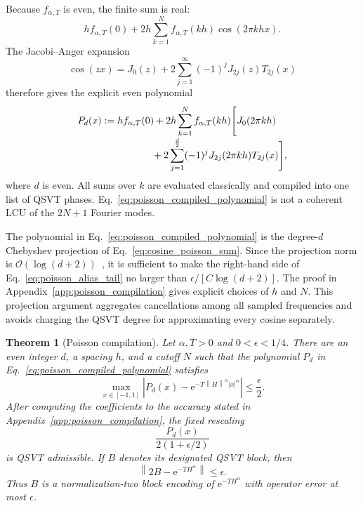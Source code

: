 \documentclass[aps,pra,reprint,floatfix,unsortedaddress,superscriptaddress]{revtex4-2}
\newtheorem{theorem}{Theorem}[section]
\newcommand{\norm}[1]{\left\lVert#1\right\rVert}
\newcommand{\abs}[1]{\left\lvert#1\right\rvert}
\newcommand{\Ocal}{\mathcal{O}}
\begin{document}
Because $f_{\alpha,T}$ is even, the finite sum is real:
\begin{equation}
    h f_{\alpha,T}(0)
    +
    2h\sum_{k=1}^{N}
    f_{\alpha,T}(kh)
    \cos(2\pi khx).
    \label{eq:cosine_poisson_sum}
\end{equation}
The Jacobi--Anger expansion~\cite{NIST:DLMF}
\begin{equation}
    \cos(zx)
    =
    J_0(z)
    +
    2\sum_{j=1}^{\infty}
    (-1)^jJ_{2j}(z)T_{2j}(x)
    \label{eq:jacobi_anger_cosine}
\end{equation}
therefore gives the explicit even polynomial
\begin{align}
    P_d(x)
    &:={}
    h f_{\alpha,T}(0)
    +2h\sum_{k=1}^{N}f_{\alpha,T}(kh)
    \Bigg[
        J_0(2\pi kh)
        \nonumber\\[-1mm]
    &\hspace{18mm}
        +2\sum_{j=1}^{\frac{d}{2}}
        (-1)^jJ_{2j}(2\pi kh)
        T_{2j}(x)
    \Bigg],
    \label{eq:poisson_compiled_polynomial}
\end{align}
where $d$ is even.  All sums over $k$ are evaluated classically and
compiled into one list of QSVT phases.  Eq.~\eqref{eq:poisson_compiled_polynomial} is not a coherent LCU of the
$2N+1$ Fourier modes.

The polynomial in Eq.~\eqref{eq:poisson_compiled_polynomial} is the
degree-$d$ Chebyshev projection of
Eq.~\eqref{eq:cosine_poisson_sum}.  Since the projection norm is
$\Ocal(\log(d+2))$~\cite{mason2003chebyshev,
trefethen2019approximation}, it is sufficient to make the right-hand side of
Eq.~\eqref{eq:poisson_alias_tail} no larger than
$\epsilon/[C\log(d+2)]$.  The proof in
Appendix~\ref{app:poisson_compilation} gives explicit choices of $h$
and $N$.  This projection argument aggregates cancellations among all
sampled frequencies and avoids charging the QSVT degree for
approximating every cosine separately.

\begin{theorem}[Poisson compilation]
\label{thm:poisson_compilation}
Let $\alpha,T>0$ and $0<\epsilon<1/4$.  There are an even integer $d$,
a spacing $h$, and a cutoff $N$ such that the polynomial $P_d$ in
Eq.~\eqref{eq:poisson_compiled_polynomial} satisfies
\begin{equation}
    \max_{x\in[-1,1]}
    \abs{
    P_d(x)-
    \mathrm e^{-T\norm{H}^{\alpha}\abs{x}^{\alpha}}
    }
    \leq\frac{\epsilon}{2}.
    \label{eq:poisson_polynomial_error}
\end{equation}
After computing the coefficients to the accuracy stated in
Appendix~\ref{app:poisson_compilation}, the fixed rescaling
\begin{equation}
    \frac{P_d(x)}{2(1+\epsilon/2)}
    \label{eq:qsvt_rescaling}
\end{equation}
is QSVT admissible.  If $B$ denotes its designated QSVT block, then
\begin{equation}
    \norm{2B-\mathrm e^{-T H^\alpha}}
    \leq\epsilon.
    \label{eq:qsvt_normalization_two_error}
\end{equation}
Thus $B$ is a normalization-two block encoding of
$\mathrm e^{-T H^\alpha}$ with operator error at most $\epsilon$.
\end{theorem}
\end{document}

